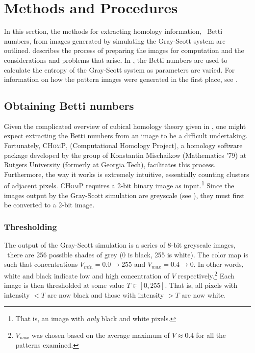 \chapter{Methods and Procedures} \label{ch:methods}

In this section, the methods for extracting homology information, \ie~Betti numbers, from images generated by simulating the Gray-Scott system are outlined.  describes the process of preparing the images for computation and the considerations and problems that arise. In , the Betti numbers are used to calculate the entropy of the Gray-Scott system as parameters are varied. For information on how the pattern images were generated in the first place, see .

\section{Obtaining Betti numbers}

Given the complicated overview of cubical homology theory given in , one might expect extracting the Betti numbers from an image to be a difficult undertaking. Fortunately, \textsc{CHomP}, (Computational Homology Project), a homology software package developed by the group of Konstantin Mischaikow (Mathematics '79) at Rutgers University (formerly at Georgia Tech), facilitates this process. Furthermore, the way it works is extremely intuitive, essentially counting clusters of adjacent pixels. \textsc{CHomP} requires a 2-bit binary image as input.\footnote{That is, an image with \emph{only} black and white pixels.} Since the images output by the Gray-Scott simulation are greyscale (see ), they must first be converted to a 2-bit image.

\subsection{Thresholding} \label{sect:thresholding}

The output of the Gray-Scott simulation is a series of 8-bit greyscale images, \ie~there are 256 possible shades of grey (0 is black, 255 is white). The color map is such that concentrations $V_{min} = 0.0 \rightarrow 255$ and $V_{max} = 0.4 \rightarrow 0$. In other words, white and black indicate low and high concentration of $V$ respectively.\footnote{$V_{max}$ was chosen based on the average maximum of $V \approx 0.4$ for all the patterns examined.} Each image is then thresholded at some value $T \in [0,255]$. That is, all pixels with intensity $< T$ are now black and those with intensity $> T$ are now white.

